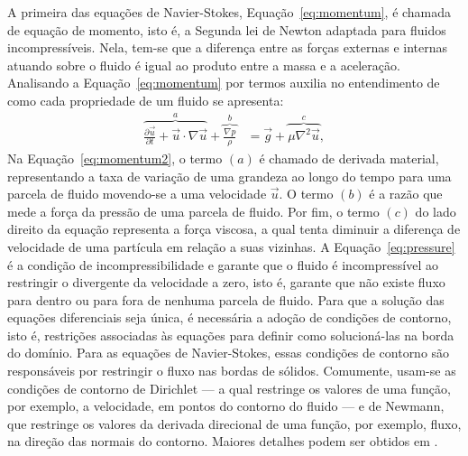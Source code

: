 \documentclass[12pt,a4paper,dvipsnames]{article}
\newcommand{\eqnref}[1]{Equação~\eqref{#1}}
\begin{document}
A primeira das equações de Navier-Stokes, \eqnref{eq:momentum}, é chamada de equação de momento, isto é, a Segunda lei de Newton adaptada para fluidos incompressíveis. Nela, tem-se que a diferença entre as forças externas e internas atuando sobre o fluido é igual ao produto entre a massa e a aceleração. Analisando a \eqnref{eq:momentum} por termos auxilia no entendimento de como cada propriedade de um fluido se apresenta:
\begin{align}
\label{eq:momentum2}
    \overbrace{\frac{\partial \Vec{u}}{\partial t} + \Vec{u} \cdot \nabla \Vec{u}}^{a} + \overbrace{\frac{\nabla p}{\rho}}^{b} & = \Vec{g} + \overbrace{\mu \nabla^2 \Vec{u}}^{c},
\end{align}
Na \eqnref{eq:momentum2}, o termo $(a)$ é chamado de derivada material, representando a taxa de variação de uma grandeza ao longo do tempo para uma parcela de fluido movendo-se a uma velocidade $\Vec{u}$. O termo $(b)$ é a razão que mede a força da pressão de uma parcela de fluido. Por fim, o termo $(c)$ do lado direito da equação representa a força viscosa, a qual tenta diminuir a diferença de velocidade de uma partícula em relação a suas vizinhas. A \eqnref{eq:pressure} é a condição de incompressibilidade e garante que o fluido é incompressível ao restringir o divergente da velocidade a zero, isto é, garante que não existe fluxo para dentro ou para fora de nenhuma parcela de fluido. Para que a solução das equações diferenciais seja única, é necessária a adoção de condições de contorno, isto é, restrições associadas às equações para definir como solucioná-las na borda do domínio. Para as equações de Navier-Stokes, essas condições de contorno são responsáveis por restringir o fluxo nas bordas de sólidos. Comumente, usam-se as condições de contorno de Dirichlet --- a qual restringe os valores de uma função, por exemplo, a velocidade, em pontos do contorno do fluido --- e de Newmann, que restringe os valores da derivada direcional de uma função, por exemplo, fluxo, na direção das normais do contorno. Maiores detalhes podem ser obtidos em \cite{kim_2017, bridson_2016}.
\end{document}
